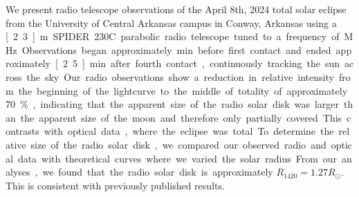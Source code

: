 We present radio telescope observations of the April 8th, 2024 total solar eclipse from the University of Central Arkansas campus in Conway, Arkansas using a \unit[2.3]{m} SPIDER 230C parabolic radio telescope tuned to a frequency of \unit[1420]{MHz}.
Observations began approximately \unit[19]{min} before first contact and ended approximately \unit[2.5]{min} after fourth contact, continuously tracking the sun across the sky.
Our radio observations show a reduction in relative intensity from the beginning of the lightcurve to the middle of totality of approximately 70\%, indicating that the apparent size of the radio solar disk was larger than the apparent size of the moon and therefore only partially covered.
This contrasts with optical data, where the eclipse was total.
To determine the relative size of the radio solar disk, we compared our observed radio and optical data with theoretical curves where we varied the solar radius.
From our analyses, we found that the radio solar disk is approximately $R_{\mathrm{1420}} = 1.27 R_{\odot}$.
This is consistent with previously published results.